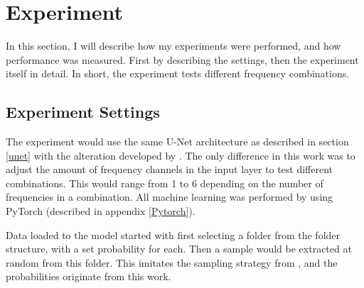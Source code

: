 \section{Experiment} \label{Experiment}
    In this section, I will describe how my experiments were performed, and how performance was measured. First by describing the settings, then the experiment itself in detail. In short, the experiment tests different frequency combinations.
    
    \subsection{Experiment Settings} \label{Experiment settings}
        The experiment would use the same U-Net architecture as described in section \ref{unet} with the alteration developed by \citeauthor{brautaset2020acoustic}\cite{brautaset2020acoustic}. The only difference in this work was to adjust the amount of frequency channels in the input layer to test different combinations. This would range from 1 to 6 depending on the number of frequencies in a combination. All machine learning was performed by using PyTorch (described in appendix \ref{Pytorch}).
        
        Data loaded to the model started with first selecting a folder from the folder structure, with a set probability for each. Then a sample would be extracted at random from this folder. This imitates the sampling strategy from \citeauthor{brautaset2020acoustic}\cite{brautaset2020acoustic}, and the probabilities originate from this work.
        
